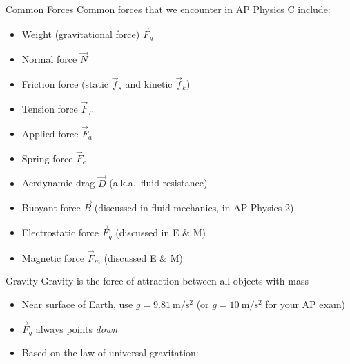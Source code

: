 \documentclass[12pt,compress,aspectratio=169]{beamer}
\begin{document}
\begin{frame}{Common Forces}
  Common forces that we encounter in AP Physics C include:
  \begin{itemize}
  \item Weight (gravitational force) $\vec F_g$
  \item Normal force $\vec N$
  \item Friction force (static $\vec f_s$ and kinetic $\vec f_k$)
  \item Tension force $\vec F_T$
  \item Applied force $\vec F_a$
  \item Spring force $\vec F_e$
  \item Aerdynamic drag $\vec D$ (a.k.a.\ fluid resistance)
  \item Buoyant force $\vec B$ (discussed in fluid mechanics, in AP Physics 2)
  \item Electrostatic force $\vec F_q$ (discussed in E \& M)
  \item Magnetic force $\vec F_m$ (discussed E \& M)
  \end{itemize}
\end{frame}



\begin{frame}{Gravity}
  Gravity is the force of attraction between all objects with mass
    
  \begin{itemize}
  \item Near surface of Earth, use $g=\SI{9.81}{\metre\per\second\squared}$ (or
    $g=\SI{10}{\metre\per\second\squared}$ for your AP exam)
  \item $\vec F_g$ always points \emph{down}
  \item Based on the law of universal gravitation:

  \end{itemize}    
\end{frame}
\end{document}
